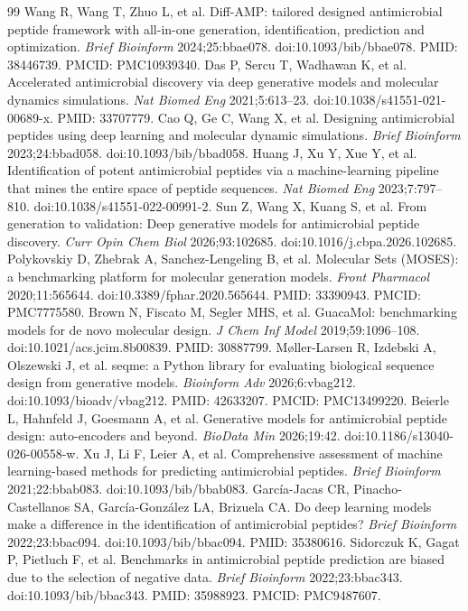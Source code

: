 \documentclass[unnumsec,webpdf,contemporary,large]{oup-authoring-template}
\begin{document}
\begin{thebibliography}{99}
 Wang R, Wang T, Zhuo L, et al. Diff-AMP: tailored designed antimicrobial peptide framework with all-in-one generation, identification, prediction and optimization. \textit{Brief Bioinform} 2024;25:bbae078. doi:10.1093/bib/bbae078. PMID: 38446739. PMCID: PMC10939340.
 Das P, Sercu T, Wadhawan K, et al. Accelerated antimicrobial discovery via deep generative models and molecular dynamics simulations. \textit{Nat Biomed Eng} 2021;5:613--23. doi:10.1038/s41551-021-00689-x. PMID: 33707779.
 Cao Q, Ge C, Wang X, et al. Designing antimicrobial peptides using deep learning and molecular dynamic simulations. \textit{Brief Bioinform} 2023;24:bbad058. doi:10.1093/bib/bbad058.
 Huang J, Xu Y, Xue Y, et al. Identification of potent antimicrobial peptides via a machine-learning pipeline that mines the entire space of peptide sequences. \textit{Nat Biomed Eng} 2023;7:797--810. doi:10.1038/s41551-022-00991-2.
 Sun Z, Wang X, Kuang S, et al. From generation to validation: Deep generative models for antimicrobial peptide discovery. \textit{Curr Opin Chem Biol} 2026;93:102685. doi:10.1016/j.cbpa.2026.102685.
 Polykovskiy D, Zhebrak A, Sanchez-Lengeling B, et al. Molecular Sets (MOSES): a benchmarking platform for molecular generation models. \textit{Front Pharmacol} 2020;11:565644. doi:10.3389/fphar.2020.565644. PMID: 33390943. PMCID: PMC7775580.
 Brown N, Fiscato M, Segler MHS, et al. GuacaMol: benchmarking models for de novo molecular design. \textit{J Chem Inf Model} 2019;59:1096--108. doi:10.1021/acs.jcim.8b00839. PMID: 30887799.
 Møller-Larsen R, Izdebski A, Olszewski J, et al. seqme: a Python library for evaluating biological sequence design from generative models. \textit{Bioinform Adv} 2026;6:vbag212. doi:10.1093/bioadv/vbag212. PMID: 42633207. PMCID: PMC13499220.
 Beierle L, Hahnfeld J, Goesmann A, et al. Generative models for antimicrobial peptide design: auto-encoders and beyond. \textit{BioData Min} 2026;19:42. doi:10.1186/s13040-026-00558-w.
 Xu J, Li F, Leier A, et al. Comprehensive assessment of machine learning-based methods for predicting antimicrobial peptides. \textit{Brief Bioinform} 2021;22:bbab083. doi:10.1093/bib/bbab083.
 García-Jacas CR, Pinacho-Castellanos SA, García-González LA, Brizuela CA. Do deep learning models make a difference in the identification of antimicrobial peptides? \textit{Brief Bioinform} 2022;23:bbac094. doi:10.1093/bib/bbac094. PMID: 35380616.
 Sidorczuk K, Gagat P, Pietluch F, et al. Benchmarks in antimicrobial peptide prediction are biased due to the selection of negative data. \textit{Brief Bioinform} 2022;23:bbac343. doi:10.1093/bib/bbac343. PMID: 35988923. PMCID: PMC9487607.

\end{thebibliography}
\end{document}
